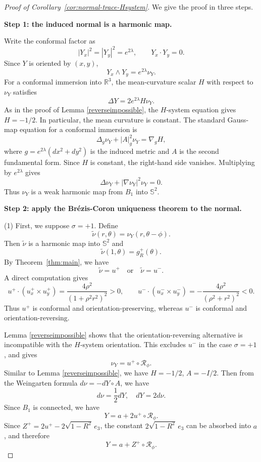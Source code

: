 \documentclass[10pt,a4paper]{amsart}
\newcommand{\B}{B_1}
\newcommand{\RR}{\mathbb R}
\newcommand{\Rot}{\mathcal R}
\newcommand{\Sph}{\mathbb{S}^2}
\newcommand{\eiii}{e_3}
\begin{document}
\begin{proof}[Proof of Corollary~\ref{cor:normal-trace-Hsystem}]
We give the proof in three steps.

\smallskip
\noindent\textbf{Step 1: the induced normal is a harmonic map.}

Write the conformal factor as
\[
|Y_x|^2=|Y_y|^2=e^{2\lambda},
\qquad
Y_x\cdot Y_y=0.
\]
Since $Y$ is oriented by $(x,y)$,
\[
Y_x\wedge Y_y=e^{2\lambda}\nu_Y.
\]
For a conformal immersion into $\RR^3$, the mean-curvature scalar $H$ with respect to $\nu_Y$ satisfies
\[
\Delta Y=2e^{2\lambda}H\nu_Y.
\]
As in the proof of Lemma \ref{reverseimpossible}, the $H$-system equation gives $H=-1/2$.
In particular, the mean curvature is constant. The standard Gauss-map equation for a conformal immersion is
\[
\Delta_g\nu_Y+|A|_g^2\nu_Y=\nabla_g H,
\]
where $g=e^{2\lambda}(dx^2+dy^2)$ is the induced metric and $A$ is the second fundamental form. Since $H$ is constant, the right-hand side
vanishes. Multiplying by $e^{2\lambda}$ gives
\[
\Delta \nu_Y+|\nabla \nu_Y|^2\nu_Y=0.
\]
Thus $\nu_Y$ is a weak harmonic map from $\B$ into $\Sph$.

\smallskip
\noindent\textbf{Step 2: apply the Br\'ezis-Coron uniqueness theorem to the normal.}

(1) First, we suppose $\sigma=+1$. Define
\[
\widetilde\nu(r,\theta)=\nu_Y(r,\theta-\phi).
\]
Then $\widetilde\nu$ is a harmonic map into $\Sph$ and
\[
\widetilde\nu(1,\theta)=g_R^+(\theta).
\]
By Theorem~\ref{thm:main}, we have
\[
\widetilde\nu=u^+\quad\text{or}\quad \widetilde\nu=u^-.
\]
A direct computation gives
\[
u^+\cdot(u^+_x\times u^+_y)
=
\frac{4\rho^2}{(1+\rho^2r^2)^2}>0,
\qquad
u^-\cdot(u^-_x\times u^-_y)
=
-\frac{4\rho^2}{(\rho^2+r^2)^2}<0.
\]
Thus $u^+$ is conformal and orientation-preserving, whereas $u^-$ is conformal and orientation-reversing.

Lemma \ref{reverseimpossible} shows that the orientation-reversing alternative is incompatible with the $H$-system orientation. This excludes
$u^-$ in the case $\sigma=+1$, and gives
\[
\nu_Y=u^+\circ\Rot_\phi.
\]
Similar to Lemma \ref{reverseimpossible}, we have $H=-1/2$, $A=-I/2$. Then from the Weingarten formula $d\nu =-dY\circ A$, we have
\[ d\nu =\frac12 dY, \quad d Y=2 d \nu. \]
Since $B_1$ is connected, we have
\[
Y=a+2u^+\circ\Rot_\phi.
\]
Since $Z^+=2u^+-2\sqrt{1-R^2}\,\eiii$, the constant $2\sqrt{1-R^2}\,\eiii$ can be absorbed into $a$, and therefore
\[
Y=a+Z^+\circ\Rot_\phi.
\]


\end{proof}
\end{document}
